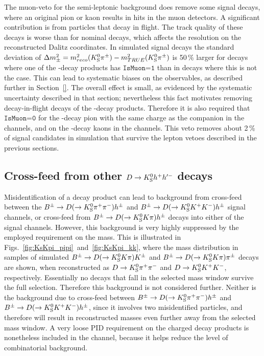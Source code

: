 

The muon-veto for the semi-leptonic background does remove some signal decays, where an original pion or kaon results in hits in the muon detectors. A significant contribution is from particles that decay in flight. The track quality of these decays is worse than for nominal decays, which affects the resolution on the reconstructed Dalitz coordinates. In simulated signal decays the standard deviation of $\Delta m^2_\pm = m^2_{reco}({{K}^0_{\mathrm{S}}}{{\pi}^\pm})-m^2_{TRUE}({{K}^0_{\mathrm{S}}}{{\pi}^\pm})$ is 50\,\% larger for decays where one of the \D-decay products has $\texttt{IsMuon=1}$ than in decays where this is not the case. This can lead to systematic biases on the observables, as described further in Section~\ref{}. The overall effect is small, as evidenced by the systematic uncertainty described in that section; nevertheless this fact motivates removing decay-in-flight decays of the \D-decay products. Therefore it is also required that $\texttt{IsMuon=0}$ for the \D-decay pion with the same charge as the companion in the \DtoKspipi channels, and on the \D-decay kaons in the \DtoKskk channels. This veto removes about 2\,\% of signal candidates in simulation that survive the lepton vetoes described in the previous sections.


\subsection{\texorpdfstring{Cross-feed from other ${D}\rightarrow{\ensuremath{{K}^0_{\mathrm{S}}}} h^+h'^-$ decays}{Cross-feed from other D->KShh' decays}} %
\label{sub:cross_feed_from_other_d_kshh_decays}

Misidentification of a \D decay product can lead to background from cross-feed between the ${{{B}^\pm}\rightarrow{\ensuremath{D}}(\rightarrow{\ensuremath{{K}^0_{\mathrm{S}}}}{\ensuremath{{\pi}^+}}{\ensuremath{{\pi}^-}})h^\pm}$ and ${{{B}^\pm}\rightarrow{\ensuremath{D}}(\rightarrow{\ensuremath{{K}^0_{\mathrm{S}}}}{\ensuremath{{K}^+}}{\ensuremath{{K}^-}})h^\pm}$ signal channels, or cross-feed from ${{{B}^\pm}\rightarrow{\ensuremath{D}}(\rightarrow{\ensuremath{{K}^0_{\mathrm{S}}}}{\ensuremath{K}}\pi)h^\pm}$ decays into either of the signal channels. However, this background is very highly suppressed by the employed requirement on the \D mass. This is illustrated in Figs.~\ref{fig:KsKpi_pipi}~and~\ref{fig:KsKpi_kk}, where the \D mass distribution in samples of simulated ${{B}^\pm}\rightarrow{\ensuremath{D}}(\rightarrow{\ensuremath{{K}^0_{\mathrm{S}}}}{\ensuremath{K}}\pi){K}^\pm$ and ${{B}^\pm}\rightarrow{\ensuremath{D}}(\rightarrow{\ensuremath{{K}^0_{\mathrm{S}}}}{\ensuremath{K}}\pi)\pi^\pm$ decays are shown, when reconstructed as ${D}\rightarrow{\ensuremath{{K}^0_{\mathrm{S}}}}{\ensuremath{{\pi}^+}}{\ensuremath{{\pi}^-}}$ and ${D}\rightarrow{\ensuremath{{K}^0_{\mathrm{S}}}}{\ensuremath{{K}^+}}{\ensuremath{{K}^-}}$, respectively. Essentially no decays that fall in the selected \D mass window survive the full selection. Therefore this background is not considered further. Neither is the background due to cross-feed between ${{B}^\pm}\rightarrow{\ensuremath{D}}(\rightarrow{\ensuremath{{K}^0_{\mathrm{S}}}}{\ensuremath{{\pi}^+}}{\ensuremath{{\pi}^-}})h^\pm$ and ${{B}^\pm}\rightarrow{\ensuremath{D}}(\rightarrow{\ensuremath{{K}^0_{\mathrm{S}}}}{\ensuremath{{K}^+}}{\ensuremath{{K}^-}})h^\pm$, since it involves two misidentified particles, and therefore will result in reconstructed \D masses even further away from the selected mass window. A very loose PID requirement on the charged \D decay products is nonetheless included in the \DtoKsKK channel, because it helps reduce the level of combinatorial background.

